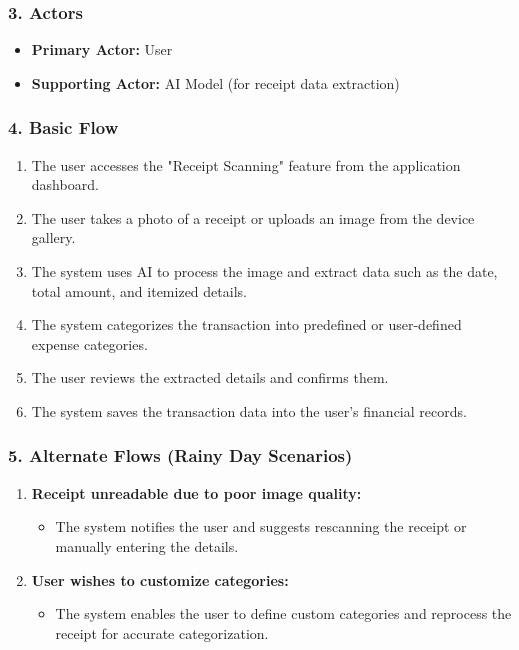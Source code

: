 \subsubsection*{3. Actors}
\begin{itemize}
    \item \textbf{Primary Actor:} User
    \item \textbf{Supporting Actor:} AI Model (for receipt data extraction)
\end{itemize}

\subsubsection*{4. Basic Flow }
\begin{enumerate}
    \item The user accesses the "Receipt Scanning" feature from the application dashboard.
    \item The user takes a photo of a receipt or uploads an image from the device gallery.
    \item The system uses AI to process the image and extract data such as the date, total amount, and itemized details.
    \item The system categorizes the transaction into predefined or user-defined expense categories.
    \item The user reviews the extracted details and confirms them.
    \item The system saves the transaction data into the user's financial records.
\end{enumerate}

\subsubsection*{5. Alternate Flows (Rainy Day Scenarios)}
\begin{enumerate}[label=5.\arabic*]
    \item \textbf{Receipt unreadable due to poor image quality:}
    \begin{itemize}
        \item The system notifies the user and suggests rescanning the receipt or manually entering the details.
    \end{itemize}
    \item \textbf{User wishes to customize categories:}
    \begin{itemize}
        \item The system enables the user to define custom categories and reprocess the receipt for accurate categorization.
    \end{itemize}
\end{enumerate}

